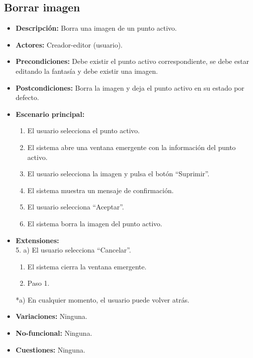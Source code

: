\documentclass[12pt,letterpaper]{article}
\begin{document}
\subsection{Borrar imagen}
\begin{itemize}
	\item \textbf{Descripción:} Borra una imagen de un punto activo.
	\item \textbf{Actores:} Creador-editor (usuario).
	\item \textbf{Precondiciones:} Debe existir el punto activo correspondiente, se debe estar editando la fantasía y debe existir una imagen.
	\item \textbf{Postcondiciones:} Borra la imagen y deja el punto activo en su estado por defecto.
	\item \textbf{Escenario principal:}
	\begin{enumerate}
		\item El usuario selecciona el punto activo.
		\item El sistema abre una ventana emergente con la información del punto activo.
		\item El usuario selecciona la imagen y pulsa el botón ``Suprimir''.
		\item El sistema muestra un mensaje de confirmación.
		\item El usuario selecciona ``Aceptar''.
		\item El sistema borra la imagen del punto activo.
	\end{enumerate}
	\item \textbf{Extensiones:} \\ 5. a) El usuario selecciona ``Cancelar''.
	\begin{enumerate}
		\item El sistema cierra la ventana emergente.
		\item Paso 1.
	\end{enumerate}
	*a) En cualquier momento, el usuario puede volver atrás.
	\item \textbf{Variaciones:} Ninguna.
	\item \textbf{No-funcional:} Ninguna.
	\item \textbf{Cuestiones:} Ninguna.
\end{itemize}
\end{document}
